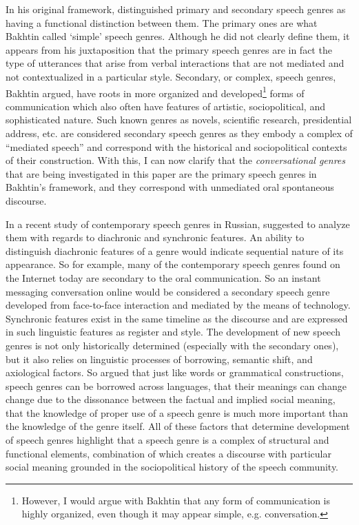 \documentclass[12pt]{article}
\begin{document}
In his original framework, \textcite{bakhtin1986} distinguished primary and secondary speech genres as having a functional distinction between them. The primary ones are what Bakhtin called `simple' speech genres. Although he did not clearly define them, it appears from his juxtaposition that the primary speech genres are in fact the type of utterances that arise from verbal interactions that are not mediated and not contextualized in a particular style. Secondary, or complex, speech genres, Bakhtin argued, have roots in more organized and developed\footnote{However, I would argue with Bakhtin that any form of communication is highly organized, even though it may appear simple, e.g. conversation.} forms of communication which also often have features of artistic, sociopolitical, and sophisticated nature. Such known genres as novels, scientific research, presidential address, etc. are considered secondary speech genres as they embody a complex of ``mediated speech'' and correspond with the historical and sociopolitical contexts of their construction. With this, I can now clarify that the \textit{conversational genres} that are being investigated in this paper are the primary speech genres in Bakhtin's framework, and they correspond with unmediated oral spontaneous discourse.

In a recent study of contemporary speech genres in Russian, \textcite{dementyev2015} suggested to analyze them with regards to diachronic and synchronic features. An ability to distinguish diachronic features of a genre would indicate sequential nature of its appearance. So for example, many of the contemporary speech genres found on the Internet today are secondary to the oral communication. So an instant messaging conversation online would be considered a secondary speech genre developed from face-to-face interaction and mediated by the means of technology. Synchronic features exist in the same timeline as the discourse and are expressed in such linguistic features as register and style. The development of new speech genres is not only historically determined (especially with the secondary ones), but it also relies on linguistic processes of borrowing, semantic shift, and axiological factors. So \textcite[p. 81-82]{dementyev2015} argued that just like words or grammatical constructions, speech genres can be borrowed across languages, that their meanings can change change due to the dissonance between the factual and implied social meaning, that the knowledge of proper use of a speech genre is much more important than the knowledge of the genre itself. All of these factors that determine development of speech genres highlight that a speech genre is a complex of structural and functional elements, combination of which creates a discourse with particular social meaning grounded in the sociopolitical history of the speech community. 
\end{document}
